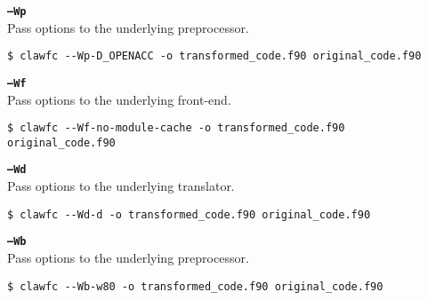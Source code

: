 \documentclass{article}
\begin{document}
\textbf{\texttt{--Wp}}\\
Pass options to the underlying preprocessor. 
\begin{lstlisting}
$ clawfc --Wp-D_OPENACC -o transformed_code.f90 original_code.f90
\end{lstlisting}

\textbf{\texttt{--Wf}}\\
Pass options to the underlying front-end. 
\begin{lstlisting}
$ clawfc --Wf-no-module-cache -o transformed_code.f90 original_code.f90
\end{lstlisting}

\textbf{\texttt{--Wd}}\\
Pass options to the underlying translator. 
\begin{lstlisting}
$ clawfc --Wd-d -o transformed_code.f90 original_code.f90
\end{lstlisting}

\textbf{\texttt{--Wb}}\\
Pass options to the underlying preprocessor. 
\begin{lstlisting}
$ clawfc --Wb-w80 -o transformed_code.f90 original_code.f90
\end{lstlisting}
\end{document}
